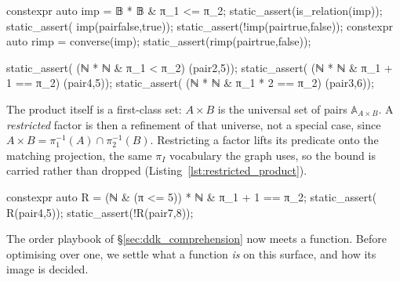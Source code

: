 \documentclass[11pt, a4paper]{article}
\begin{document}
\begin{listing}[htbp]
\caption{Relations as comprehensions over a product, point-free in the projections $\pi_1, \pi_2$.
\textbf{Left} ($\mathbb{B}$): implication $a \le b$ on $\mathbb{B}\times\mathbb{B}$, and its .
\textbf{Right} ($\mathbb{N}$): less-than, and two \emph{functional} graphs written point-free via the projection arithmetic: the successor $b = a{+}1$ and the doubler $b = 2a$.}
\label{lst:relation_examples}
\noindent
\begin{minipage}[t]{0.49\linewidth}
\begin{cpp}
constexpr auto imp =
  𝔹 * 𝔹 & π_1 <= π_2;
static_assert(is_relation(imp));
static_assert( imp(pair{false,true}));
static_assert(!imp(pair{true,false}));
constexpr auto rimp = converse(imp);
static_assert(rimp(pair{true,false}));
\end{cpp}
\end{minipage}\hfill
\begin{minipage}[t]{0.49\linewidth}
\begin{cpp}
static_assert(
  (ℕ * ℕ & π_1 < π_2)
  (pair{2,5}));
static_assert(
  (ℕ * ℕ & π_1 + 1 == π_2)
  (pair{4,5}));
static_assert(
  (ℕ * ℕ & π_1 * 2 == π_2)
  (pair{3,6}));
\end{cpp}
\end{minipage}
\end{listing}

The product itself is a first-class set: $A \times B$ is the universal set of pairs $\mathbb{A}_{A\times B}$.
A \emph{restricted} factor is then a refinement of that universe, not a special case, since $A \times B = \pi_1^{-1}(A) \cap \pi_2^{-1}(B)$.
Restricting a factor lifts its predicate onto the matching projection, the same $\pi_I$ vocabulary the graph uses, so the bound is carried rather than dropped (Listing~\ref{lst:restricted_product}).

\begin{listing}[htbp]
\caption{A restricted domain is a cylinder on the product.
The bound $\le 5$ on the first factor lifts to $\pi_1 \le \mathrm{fix}(5)$, so it survives into the relation instead of being discarded.}
\label{lst:restricted_product}
\begin{cpp}
constexpr auto R =
  (ℕ & (π <= 5)) * ℕ
  & π_1 + 1 == π_2;
static_assert( R(pair{4,5}));
static_assert(!R(pair{7,8}));
\end{cpp}
\end{listing}

The order playbook of §\ref{sec:ddk_comprehension} now meets a function.
Before optimising over one, we settle what a function \emph{is} on this surface, and how its image is decided.
\end{document}

